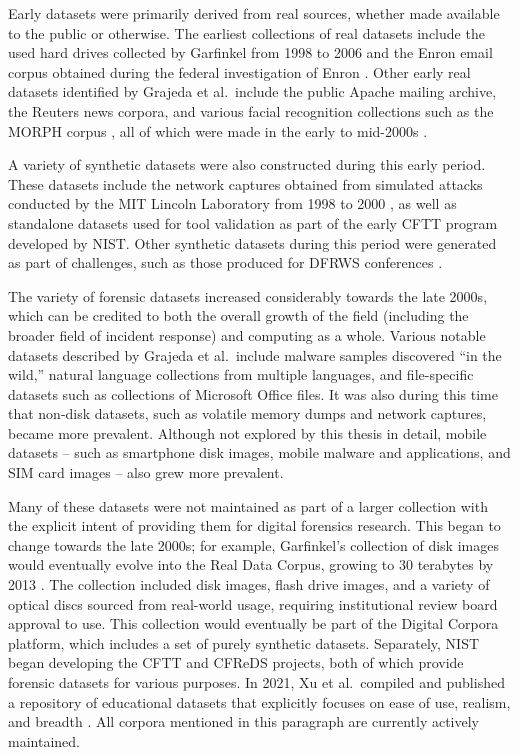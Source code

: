 \documentclass[letterpaper,12pt]{report}
\begin{document}
Early datasets were primarily derived from real sources, whether made
available to the public or otherwise. The earliest collections of real
datasets include the used hard drives collected by Garfinkel from 1998
to 2006 and the Enron email corpus obtained during the federal
investigation of Enron \cite{garfinkelForensicCorporaChallenge2007}.
Other early real datasets identified by Grajeda et al.~include the
public Apache mailing archive, the Reuters news corpora, and various
facial recognition collections such as the MORPH corpus
\cite{ricanekMORPHLongitudinalImage2006}, all of which were made in
the early to mid-2000s
\cite{yannikosDataCorporaDigital2014,grajedaAvailabilityDatasetsDigital2017}.

A variety of synthetic datasets were also constructed during this early
period. These datasets include the network captures obtained from
simulated attacks conducted by the MIT Lincoln Laboratory from 1998 to
2000 \cite{garfinkelForensicCorporaChallenge2007}, as well as
standalone datasets used for tool validation as part of the early CFTT
program developed by NIST. Other synthetic datasets during this period
were generated as part of challenges, such as those produced for DFRWS
conferences \cite{woodsCreatingRealisticCorpora2011}.

The variety of forensic datasets increased considerably towards the late
2000s, which can be credited to both the overall growth of the field
(including the broader field of incident response) and computing as a
whole. Various notable datasets described by Grajeda et al.~include
malware samples discovered ``in the wild,'' natural language collections
from multiple languages, and file-specific datasets such as collections
of Microsoft Office files. It was also during this time that non-disk
datasets, such as volatile memory dumps and network captures, became
more prevalent. Although not explored by this thesis in detail, mobile
datasets -- such as smartphone disk images, mobile malware and
applications, and SIM card images -- also grew more prevalent.

Many of these datasets were not maintained as part of a larger
collection with the explicit intent of providing them for digital
forensics research. This began to change towards the late 2000s; for
example, Garfinkel's collection of disk images would eventually evolve
into the Real Data Corpus, growing to 30 terabytes by 2013
\cite{garfinkelBringingScienceDigital2009a,yannikosDataCorporaDigital2014}.
The collection included disk images, flash drive images, and a variety
of optical discs sourced from real-world usage, requiring institutional
review board approval to use. This collection would eventually be part
of the Digital Corpora platform, which includes a set of purely
synthetic datasets. Separately, NIST began developing the CFTT and
CFReDS projects, both of which provide forensic datasets for various
purposes. In 2021, Xu et al.~compiled and published a repository of
educational datasets that explicitly focuses on ease of use, realism,
and breadth \cite{xuDesigningSharedDigital2022}. All corpora
mentioned in this paragraph are currently actively maintained.
\end{document}

